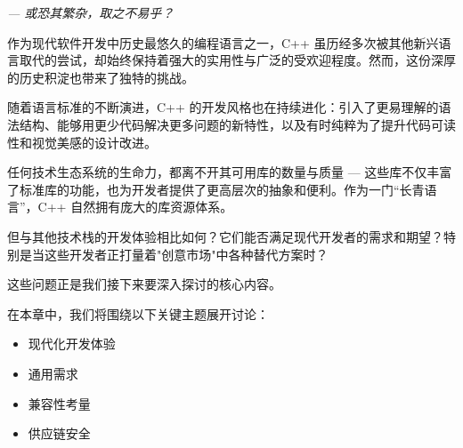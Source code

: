 \begin{flushright}
\textit{--- 或恐其繁杂，取之不易乎？}
\end{flushright}

作为现代软件开发中历史最悠久的编程语言之一，C++ 虽历经多次被其他新兴语言取代的尝试，却始终保持着强大的实用性与广泛的受欢迎程度。然而，这份深厚的历史积淀也带来了独特的挑战。

随着语言标准的不断演进，C++ 的开发风格也在持续进化：引入了更易理解的语法结构、能够用更少代码解决更多问题的新特性，以及有时纯粹为了提升代码可读性和视觉美感的设计改进。

任何技术生态系统的生命力，都离不开其可用库的数量与质量 --- 这些库不仅丰富了标准库的功能，也为开发者提供了更高层次的抽象和便利。作为一门“长青语言”，C++ 自然拥有庞大的库资源体系。

但与其他技术栈的开发体验相比如何？它们能否满足现代开发者的需求和期望？特别是当这些开发者正打量着"创意市场"中各种替代方案时？

这些问题正是我们接下来要深入探讨的核心内容。

在本章中，我们将围绕以下关键主题展开讨论：

\begin{itemize}
\item 
现代化开发体验

\item 
通用需求

\item 
兼容性考量

\item 
供应链安全
\end{itemize}









